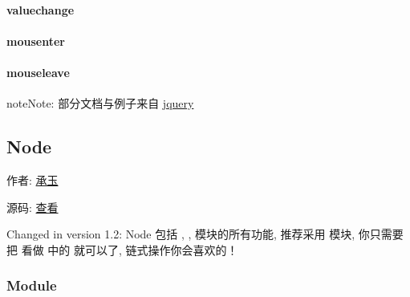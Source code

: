 \documentclass[letterpaper,10pt,english]{sphinxmanual}
\begin{document}
\paragraph{valuechange}
\label{api/core/event/valuechange:valuechange}\label{api/core/event/valuechange::doc}

\paragraph{mousenter}
\label{api/core/event/mousenter::doc}\label{api/core/event/mousenter:mousenter}

\paragraph{mouseleave}
\label{api/core/event/mouseleave:mouseleave}\label{api/core/event/mouseleave::doc}
\begin{notice}{note}{Note:}
部分文档与例子来自 \href{http://api.jquery.com}{jquery}
\end{notice}
\label{api/core/node/index:module-Node}

\subsection{Node}
\label{api/core/node/index:node}\label{api/core/node/index::doc}
\begin{DUlineblock}{0em}
\item[] 作者: \href{mailto:yiminghe@gmail.com}{承玉}
\item[] 源码: \href{https://github.com/kissyteam/kissy/tree/master/src/node}{查看}
\end{DUlineblock}
Changed in version 1.2: Node 包括 {\hyperref[api/core/dom/index:module-DOM]{}} , {\hyperref[api/core/event/index:module-Event]{}} , {\hyperref[api/core/anim/index:module-Anim]{}} 模块的所有功能, 推荐采用  模块,
你只需要把  看做  中的 \code{\$} 就可以了,
链式操作你会喜欢的！

\subsubsection{Module}
\label{api/core/node/index:module}\begin{quote}

{\hyperref[api/core/node/index:module-Node]{}}
\end{quote}
\end{document}
